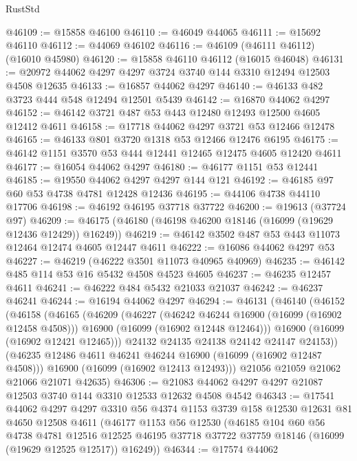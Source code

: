 \begin{lexlean}{RustStd}
\begin{coremodule}
@46109 := @15858 @46100
@46110 := @46049 @44065
@46111 := @15692 @46110
@46112 := @44069 @46102
@46116 := @46109 (@46111 @46112) (@16010 @45980)
@46120 := @15858 @46110 @46112 (@16015 @46048)
@46131 := @20972 @44062 @4297 @4297 @3724 @3740 @144 @3310 @12494 @12503 @4508 @12635
@46133 := @16857 @44062 @4297
@46140 := @46133 @482 @3723 @444 @548 @12494 @12501 @5439
@46142 := @16870 @44062 @4297
@46152 := @46142 @3721 @487 @53 @443 @12480 @12493 @12500 @4605 @12412 @4611
@46158 := @17718 @44062 @4297 @3721 @53 @12466 @12478
@46165 := @46133 @801 @3720 @1318 @53 @12466 @12476 @6195
@46175 := @46142 @1151 @3570 @53 @444 @12441 @12465 @12475 @4605 @12420 @4611
@46177 := @16054 @44062 @4297
@46180 := @46177 @1151 @53 @12441
@46185 := @19550 @44062 @4297 @4297 @144 @121
@46192 := @46185 @97 @60 @53 @4738 @4781 @12428 @12436
@46195 := @44106 @4738 @44110 @17706
@46198 := @46192 @46195 @37718 @37722
@46200 := @19613 (@37724 @97)
@46209 := @46175 (@46180 (@46198 @46200 @18146 (@16099 (@19629 @12436 @12429)) @16249))
@46219 := @46142 @3502 @487 @53 @443 @11073 @12464 @12474 @4605 @12447 @4611
@46222 := @16086 @44062 @4297 @53
@46227 := @46219 (@46222 @3501 @11073 @40965 @40969)
@46235 := @46142 @485 @114 @53 @16 @5432 @4508 @4523 @4605
@46237 := @46235 @12457 @4611
@46241 := @46222 @484 @5432 @21033 @21037
@46242 := @46237 @46241
@46244 := @16194 @44062 @4297
@46294 := @46131
    (@46140
      (@46152
        (@46158
          (@46165
            (@46209
              (@46227
                (@46242 @46244 @16900 (@16099 (@16902 @12458 @4508)))
                @16900
                (@16099 (@16902 @12448 @12464)))
              @16900
              (@16099 (@16902 @12421 @12465)))
            @24132
            @24135
            @24138
            @24142
            @24147
            @24153))
        (@46235 @12486 @4611 @46241 @46244 @16900 (@16099 (@16902 @12487 @4508)))
        @16900
        (@16099 (@16902 @12413 @12493)))
      @21056
      @21059
      @21062
      @21066
      @21071
      @42635)
@46306 := @21083 @44062 @4297 @4297 @21087 @12503 @3740 @144 @3310 @12533 @12632 @4508 @4542
@46343 := @17541
    @44062
    @4297
    @4297
    @3310
    @56
    @4374
    @1153
    @3739
    @158
    @12530
    @12631
    @81
    @4650
    @12508
    @4611
    (@46177
      @1153
      @56
      @12530
      (@46185
        @104
        @60
        @56
        @4738
        @4781
        @12516
        @12525
        @46195
        @37718
        @37722
        @37759
        @18146
        (@16099 (@19629 @12525 @12517))
        @16249))
@46344 := @17574 @44062

\end{coremodule}
\end{lexlean}
